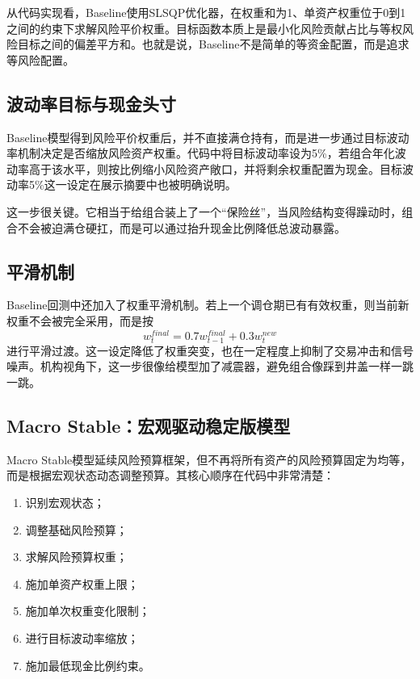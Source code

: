 \documentclass[12pt,a4paper]{ctexart}
\begin{document}
从代码实现看，Baseline使用SLSQP优化器，在权重和为1、单资产权重位于0到1之间的约束下求解风险平价权重。目标函数本质上是最小化风险贡献占比与等权风险目标之间的偏差平方和。也就是说，Baseline不是简单的等资金配置，而是追求等风险配置。

\subsection{波动率目标与现金头寸}

Baseline模型得到风险平价权重后，并不直接满仓持有，而是进一步通过目标波动率机制决定是否缩放风险资产权重。代码中将目标波动率设为5\%，若组合年化波动率高于该水平，则按比例缩小风险资产敞口，并将剩余权重配置为现金。目标波动率5\%这一设定在展示摘要中也被明确说明。

这一步很关键。它相当于给组合装上了一个“保险丝”，当风险结构变得躁动时，组合不会被迫满仓硬扛，而是可以通过抬升现金比例降低总波动暴露。

\subsection{平滑机制}

Baseline回测中还加入了权重平滑机制。若上一个调仓期已有有效权重，则当前新权重不会被完全采用，而是按
\[
w_t^{final} = 0.7 w_{t-1}^{final} + 0.3 w_t^{new}
\]
进行平滑过渡。这一设定降低了权重突变，也在一定程度上抑制了交易冲击和信号噪声。机构视角下，这一步很像给模型加了减震器，避免组合像踩到井盖一样一跳一跳。

\subsection{Macro Stable：宏观驱动稳定版模型}

Macro Stable模型延续风险预算框架，但不再将所有资产的风险预算固定为均等，而是根据宏观状态动态调整预算。其核心顺序在代码中非常清楚：

\begin{enumerate}[label=\arabic*)]
    \item 识别宏观状态；
    \item 调整基础风险预算；
    \item 求解风险预算权重；
    \item 施加单资产权重上限；
    \item 施加单次权重变化限制；
    \item 进行目标波动率缩放；
    \item 施加最低现金比例约束。
\end{enumerate}
\end{document}
